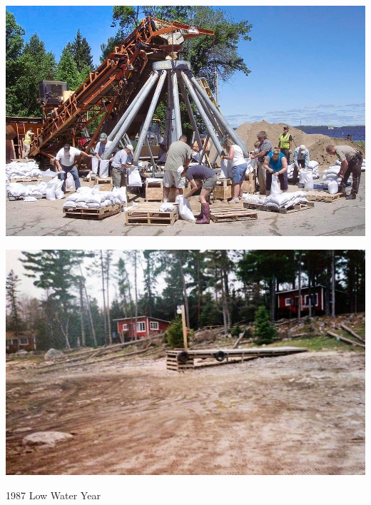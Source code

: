 \documentclass[compress,english]{beamer}
\begin{document}
{{{{\usebackgroundtemplate%
	{\includegraphics[height=\paperheight]{myersFLOOD0618c10_0.jpg}}

\begin{frame}{}

\footnotetext{\color{white}{Photo by John Meyers, Duluth News Tribune}}
  
\end{frame}
}


{{\usebackgroundtemplate%
	{\includegraphics[height=\paperheight]{1987_drought_on_Kabetogama_2.png}}

\begin{frame}{1987 Low Water Year}

\footnotetext{\color{white}{Photo by Larry Kec}}

\end{frame}
}


}}}}
\end{document}
